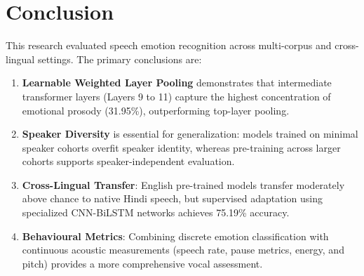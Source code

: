 \documentclass[10pt,journal,compsoc]{IEEEtran}
\begin{document}
\section{Conclusion}
\label{sec:conclusion}

This research evaluated speech emotion recognition across multi-corpus and cross-lingual settings. The primary conclusions are:
\begin{enumerate}
    \item \textbf{Learnable Weighted Layer Pooling} demonstrates that intermediate transformer layers (Layers 9 to 11) capture the highest concentration of emotional prosody (31.95\%), outperforming top-layer pooling.
    \item \textbf{Speaker Diversity} is essential for generalization: models trained on minimal speaker cohorts overfit speaker identity, whereas pre-training across larger cohorts supports speaker-independent evaluation.
    \item \textbf{Cross-Lingual Transfer}: English pre-trained models transfer moderately above chance to native Hindi speech, but supervised adaptation using specialized CNN-BiLSTM networks achieves 75.19\% accuracy.
    \item \textbf{Behavioural Metrics}: Combining discrete emotion classification with continuous acoustic measurements (speech rate, pause metrics, energy, and pitch) provides a more comprehensive vocal assessment.
\end{enumerate}



\end{document}
